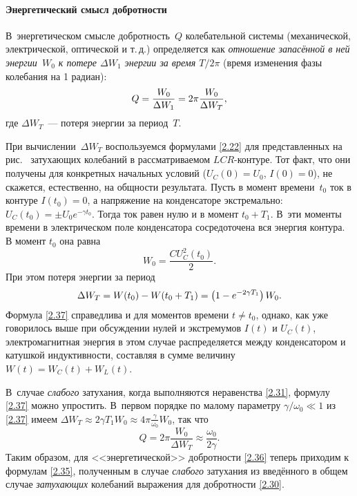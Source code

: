 \paragraph{Энергетический смысл добротности}
В~энергетическом смысле добротность~$Q$ колебательной системы
(механической, электрической, оптической и т.\,д.) определяется как 
\emph{отношение
запасённой в ней энергии~$W_0$ к потере $\Delta W_1$ энергии за время $T/2\pi$}
(время изменения фазы колебания на 1 радиан):
\begin{equation}\eqmark{2.36}
Q=\dfrac{W_0}{\Delta W_1}=2\pi\dfrac{W_0}{\Delta W_T},
\end{equation}
где  $\Delta W_T$~--- потеря энергии за период~$T$.

При вычислении~$\Delta W_T$
воспользуемся формулами \eqref{2.22} для представленных на рис.~
затухающих колебаний в рассматриваемом $LCR$-контуре. Тот факт, что
они получены для конкретных начальных условий ($U_C(0)=U_0$, $I(0)=0$),
не скажется, естественно, на общности результата. Пусть в момент времени~$t_0$ ток
в контуре $I(t_0)=0$, а напряжение на конденсаторе экстремально: $U_C(t_0)=\pm
U_0e^{-\gamma t_0}$. Тогда ток равен нулю и в момент $t_0+T_1$. В~эти моменты
времени в электрическом поле конденсатора сосредоточена вся энергия контура. 
В момент $t_0$ она равна
\begin{equation*}
W_0 = \frac{CU_C^2(t_0)}{2}.
\end{equation*}
При этом потеря энергии за период
\begin{equation}
	\eqmark{2.37}
			 \Delta W_T = W(t_0)-W(t_0+T_1)=\left(1-e^{-2\gamma T_1} \right)W_0.
\end{equation}
Формула \eqref{2.37} справедлива и для моментов времени $t\ne t_0$, однако, 
как уже говорилось выше при обсуждении нулей и экстремумов $I(t)$ и $U_C(t)$,
электромагнитная энергия в этом случае распределяется между конденсатором и
катушкой индуктивности, составляя в сумме величину~$W(t)=W_C(t)+W_L(t)$.

В~случае \emph{слабого} затухания, когда выполняются неравенства
\eqref{2.31}, формулу \eqref{2.37} можно упростить. В~первом порядке по малому
параметру $\gamma/\omega_0 \ll 1$
из \eqref{2.37} имеем 
$\Delta W_T \approx 2\gamma T_1 W_0 \approx 4\pi \frac{\gamma}{\omega_0} W_0$, так что
\begin{equation*}
Q = 2\pi \frac{W_0}{\Delta W_T} \approx \frac{\omega_0}{2\gamma}.
\end{equation*}
Таким образом, для <<энергетической>> добротности \eqref{2.36} теперь 
приходим к формулам \eqref{2.35}, полученным в случае \emph{слабого} 
затухания из введённого в общем случае \emph{затухающих} колебаний 
выражения для добротности \eqref{2.30}.

